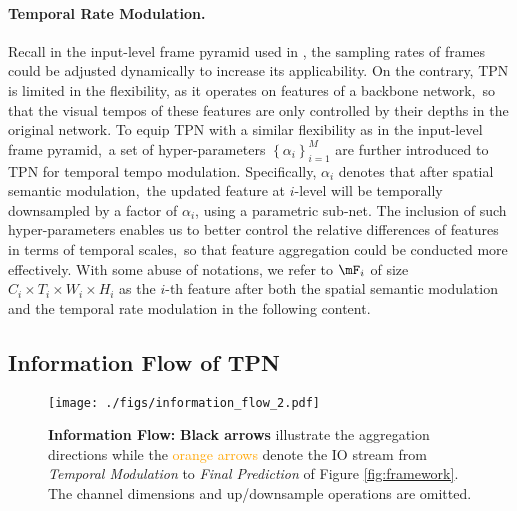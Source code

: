 \documentclass[10pt,twocolumn,letterpaper]{article}
\begin{document}
\paragraph{Temporal Rate Modulation.} 

Recall in the input-level frame pyramid used in \cite{slowfast}, the sampling rates of frames could be adjusted dynamically to increase its applicability.
On the contrary, TPN is limited in the flexibility, as it operates on features of a backbone network,\
so that the visual tempos of these features are only controlled by their depths in the original network.
To equip TPN with a similar flexibility as in the input-level frame pyramid,\
a set of hyper-parameters $\left\{\alpha_i\right\}_{i=1}^M$ are further introduced to TPN for temporal tempo modulation.
Specifically, $\alpha_i$ denotes that after spatial semantic modulation,\
the updated feature at $i$-level will be temporally downsampled by a factor of $\alpha_i$, using a parametric sub-net.
The inclusion of such hyper-parameters enables us to better control the relative differences of features in terms of temporal scales,\
so that feature aggregation could be conducted more effectively.
With some abuse of notations, we refer to $\mF_i$ of size $C_i \times T_i \times W_i \times H_i$ as the $i$-th feature after both the spatial semantic modulation and the temporal rate modulation in the following content.


\subsection{Information Flow of TPN}\label{subsec:infoflow}

\begin{figure}[t]
    \centering
    \texttt{[image: ./figs/information\_flow\_2.pdf]}
    \caption{
        \textbf{Information Flow:}
        \textbf{Black arrows} illustrate the aggregation directions while the \textcolor{orange}{orange arrows} denote the IO stream from \emph{Temporal Modulation} to \emph{Final Prediction} of Figure \ref{fig:framework}.
        The channel dimensions and up/downsample operations are omitted.
    }
    \label{fig:flow}
    \end{figure}
\end{document}
